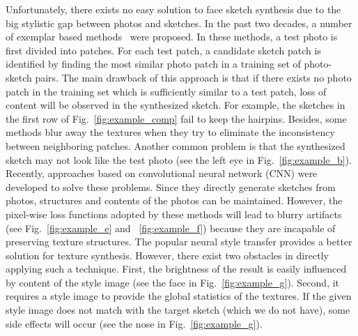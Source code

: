 \documentclass[10pt,twocolumn,letterpaper]{article}
\newcommand\ken[1]{{\small \textcolor{red}{\emph{}}}}
\begin{document}
Unfortunately, there exists no easy solution to face sketch synthesis due to the big stylistic gap between photos and sketches. In the past two decades, a number of exemplar based methods~\cite{wang2009face,song2014real, zhang2010lighting,zhou2012markov} were proposed. In these methods, a test photo is first divided into patches. For each test patch, a candidate sketch patch is identified by finding the most similar photo patch in a training set of photo-sketch pairs. The main drawback of this approach is that if there exists no photo patch in the training set which is  sufficiently similar to a test patch, loss of content will be observed in the synthesized sketch. For example, the sketches in the first row of Fig.~\ref{fig:example_comp} fail to keep the hairpins. Besides, some methods \cite{song2014real,zhou2012markov} blur away the textures when they try to eliminate the inconsistency between neighboring patches. Another common problem is that the synthesized sketch may not look like the test photo (see the left eye in Fig.~\ref{fig:example_b}). Recently, approaches \cite{zhang2017content,zhang2015end} based on convolutional neural network (CNN) were developed to solve these problems. Since they directly generate sketches from photos, structures and contents of the photos can be maintained. However, the pixel-wise loss functions adopted by these methods will lead to blurry artifacts (see Fig.~\ref{fig:example_e} and ~\ref{fig:example_f}) because they are incapable of preserving texture structures. The popular neural style transfer provides a better solution for texture synthesis. However, there exist two obstacles in directly applying such a technique. First, the brightness of the result is easily influenced by content of the style image (see the face in Fig.~\ref{fig:example_g}). Second, it requires a style image to provide the global statistics of the textures. If the given style image does not match with the target sketch (which we do not have), some side effects will occur (see the nose in Fig.~\ref{fig:example_g}). \ken{I cannot see the problem in 1(h)} %
\end{document}
